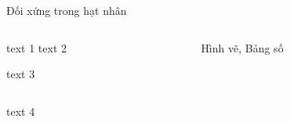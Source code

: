 \begin{frame}[label = doixung3]{Đối xứng trong hạt nhân}

\begin{columns}[c]

 \begin{column}{0.4\textwidth}
 
  text 1	
  text 2

  text 3
		
 \end{column}
	
 \begin{column}{0.4\textwidth}
 Hình vẽ, Bảng số
 \end{column}

\end{columns}

  text 4

\end{frame}
